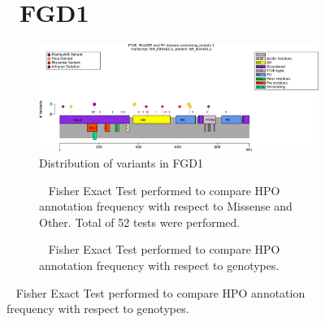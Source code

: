 \begin{figure}[htbp]
    \section*{ FGD1}
    \centering
    \begin{subfigure}[b]{0.95\textwidth}
    \centering
    \includegraphics[width=\textwidth]{ img/FGD1_protein_diagram.pdf} 
    \captionsetup{justification=raggedright,singlelinecheck=false}
    \caption{Distribution of variants in FGD1}
    \end{subfigure}
    
    \vspace{2em}
    
    \begin{subfigure}[b]{0.95\textwidth}
    \centering
    \captionsetup{justification=raggedright,singlelinecheck=false}
    \caption{         Fisher Exact Test performed to compare HPO annotation frequency with respect to Missense and Other. Total of
            52 tests were performed. }
    \end{subfigure}
    \vspace{2em}
    \begin{subfigure}[b]{0.95\textwidth}
    \centering
    \captionsetup{justification=raggedright,singlelinecheck=false}
    \caption{             Fisher Exact Test performed to compare HPO annotation frequency with respect to genotypes. }
    \end{subfigure}
    

\end{figure}

